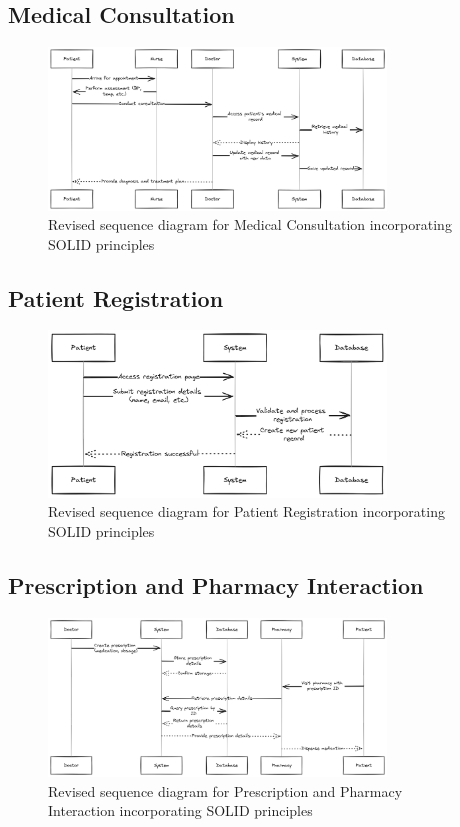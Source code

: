 \documentclass[12pt]{article}
\begin{document}
\newpage

\subsection*{Medical Consultation}
\begin{figure}[h!]
\centering
\includegraphics[width=0.8\textwidth]{2.png} %
\caption{Revised sequence diagram for Medical Consultation incorporating SOLID principles}
\end{figure}

\newpage

\subsection*{Patient Registration}
\begin{figure}[h!]
\centering
\includegraphics[width=0.8\textwidth]{3.png}
\caption{Revised sequence diagram for Patient Registration incorporating SOLID principles}
\end{figure}

\newpage

\subsection*{Prescription and Pharmacy Interaction}
\begin{figure}[h!]
\centering
\includegraphics[width=0.8\textwidth]{4.png}
\caption{Revised sequence diagram for Prescription and Pharmacy Interaction incorporating SOLID principles}
\end{figure}
\end{document}
